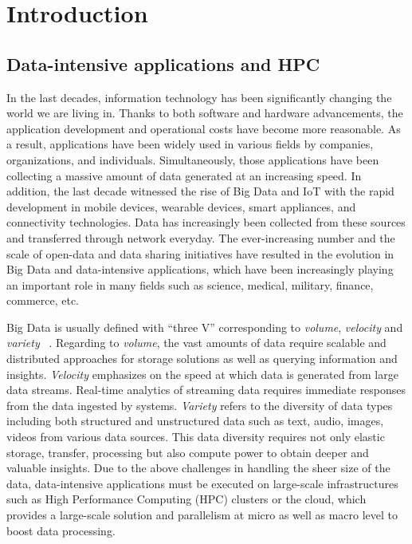 \chapter{Introduction}
\label{introduction}

\section{Data-intensive applications and HPC}

In the last decades, information technology has been significantly changing the 
world we are living in. 
Thanks to both software and hardware advancements, the application development 
and operational costs have become more reasonable. 
As a result, applications have been widely used in various fields by companies, 
organizations, and individuals. Simultaneously, those applications have been 
collecting a massive amount of data generated at an increasing speed.
In addition, the last decade witnessed the rise of Big Data and IoT with the rapid 
development in mobile devices, wearable devices, smart appliances, 
and connectivity technologies. Data has increasingly been collected from 
these sources and transferred through network everyday. 
The ever-increasing number and the scale of open-data and data sharing initiatives 
have resulted in the evolution in Big Data and data-intensive applications, 
which have been increasingly playing an important role in many fields such as 
science, medical, military, finance, commerce, etc.

Big Data is usually defined with ``three V'' corresponding to \textit{volume}, 
\textit{velocity} and \textit{variety} ~\cite{de2016formal}.  
Regarding to \textit{volume}, the vast amounts of data require scalable and distributed 
approaches for storage solutions as well as querying information and insights.  
\textit{Velocity} emphasizes on the speed at which data is generated from large data 
streams. Real-time analytics of streaming data requires immediate responses 
from the data ingested by systems.
\textit{Variety} refers to the diversity of data types including both structured and 
unstructured data such as text, audio, images, videos from various data sources.
This data diversity requires not only elastic storage, transfer, processing but also 
compute power to obtain deeper and valuable insights.  
Due to the above challenges in handling the sheer size of the data, data-intensive 
applications must be executed on large-scale infrastructures such as High Performance 
Computing (HPC) clusters or the cloud, which provides a large-scale solution 
and parallelism at micro as well as macro level to boost data processing.


